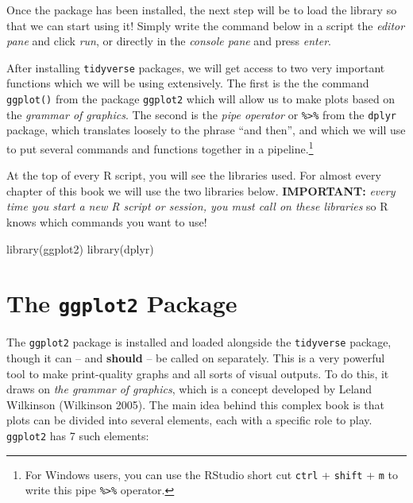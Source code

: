 \documentclass[
  letterpaper,
  DIV=11,
  numbers=noendperiod]{scrreprt}
\newenvironment{Shaded}{\begin{snugshade}}{\end{snugshade}}
\newcommand{\FunctionTok}[1]{\textcolor[rgb]{0.28,0.35,0.67}{#1}}
\newcommand{\NormalTok}[1]{\textcolor[rgb]{0.00,0.23,0.31}{#1}}
\begin{document}
Once the package has been installed, the next step will be to load the
library so that we can start using it! Simply write the command below in
a script the \emph{editor pane} and click \emph{run}, or directly in the
\emph{console pane} and press \emph{enter}.

After installing \texttt{tidyverse} packages, we will get access to two
very important functions which we will be using extensively. The first
is the the command \texttt{ggplot()} from the package \texttt{ggplot2}
which will allow us to make plots based on the \emph{grammar of
graphics}. The second is the \emph{pipe operator} or
\texttt{\%\textgreater{}\%} from the \texttt{dplyr} package, which
translates loosely to the phrase ``and then'', and which we will use to
put several commands and functions together in a pipeline.\footnote{For
  Windows users, you can use the RStudio short cut \texttt{ctrl} +
  \texttt{shift} + \texttt{m} to write this pipe
  \texttt{\%\textgreater{}\%} operator.}

At the top of every R script, you will see the libraries used. For
almost every chapter of this book we will use the two libraries below.
\textbf{IMPORTANT:} \emph{every time you start a new R script or
session, you must call on these libraries} so R knows which commands you
want to use!

\begin{Shaded}
\begin{Highlighting}[]
\FunctionTok{library}\NormalTok{(ggplot2)}
\FunctionTok{library}\NormalTok{(dplyr)}
\end{Highlighting}
\end{Shaded}

\section{\texorpdfstring{The \texttt{ggplot2}
Package}{The ggplot2 Package}}\label{the-ggplot2-package}

The \texttt{ggplot2} package is installed and loaded alongside the
\texttt{tidyverse} package, though it can -- and \textbf{should} -- be
called on separately. This is a very powerful tool to make print-quality
graphs and all sorts of visual outputs. To do this, it draws on
\emph{the grammar of graphics}, which is a concept developed by Leland
Wilkinson (Wilkinson 2005). The main idea behind this complex book is
that plots can be divided into several elements, each with a specific
role to play. \texttt{ggplot2} has 7 such elements:
\end{document}
